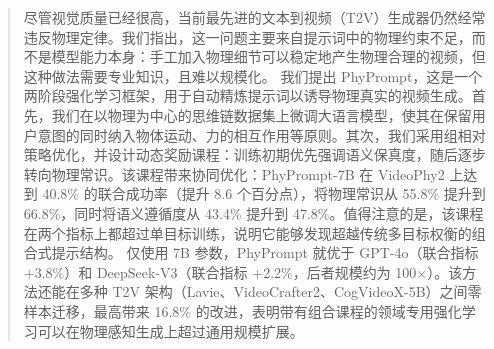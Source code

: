 \begin{abstract}
尽管视觉质量已经很高，当前最先进的文本到视频（T2V）生成器仍然经常违反物理定律。我们指出，这一问题主要来自提示词中的物理约束不足，而不是模型能力本身：手工加入物理细节可以稳定地产生物理合理的视频，但这种做法需要专业知识，且难以规模化。
我们提出 PhyPrompt，这是一个两阶段强化学习框架，用于自动精炼提示词以诱导物理真实的视频生成。首先，我们在以物理为中心的思维链数据集上微调大语言模型，使其在保留用户意图的同时纳入物体运动、力的相互作用等原则。其次，我们采用组相对策略优化，并设计动态奖励课程：训练初期优先强调语义保真度，随后逐步转向物理常识。该课程带来协同优化：PhyPrompt-7B 在 VideoPhy2 上达到 40.8\% 的联合成功率（提升 8.6 个百分点），将物理常识从 55.8\% 提升到 66.8\%，同时将语义遵循度从 43.4\% 提升到 47.8\%。值得注意的是，该课程在两个指标上都超过单目标训练，说明它能够发现超越传统多目标权衡的组合式提示结构。
仅使用 7B 参数，PhyPrompt 就优于 GPT-4o（联合指标 +3.8\%）和 DeepSeek-V3（联合指标 +2.2\%，后者规模约为 100$\times$）。该方法还能在多种 T2V 架构（Lavie、VideoCrafter2、CogVideoX-5B）之间零样本迁移，最高带来 16.8\% 的改进，表明带有组合课程的领域专用强化学习可以在物理感知生成上超过通用规模扩展。
\end{abstract}
